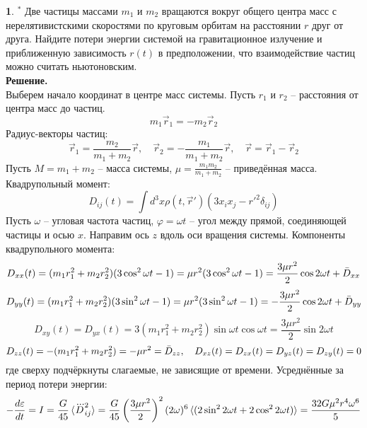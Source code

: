 \documentclass[12pt]{article}
\theoremstyle{definition}
\newtheorem{zad}{}[section]
\begin{document}
\begin{zad}
\textbf{$^*$} Две частицы массами $m_1$ и $m_2$ вращаются вокруг общего центра масс с нерелятивистскими скоростями по круговым орбитам на расстоянии $r$ друг от друга. Найдите потери энергии системой на гравитационное излучение и приближенную зависимость $r(t)$ в предположении, что взаимодействие частиц можно считать ньютоновским.\\
\textbf{Решение.}\\
Выберем начало координат в центре масс системы. Пусть $r_1$ и $r_2$ -- расстояния от центра масс до частиц.
\begin{equation}
    m_1\vec{r}_1=-m_2\vec{r}_2
\end{equation}
Радиус-векторы частиц:
\begin{equation}
    \vec{r}_1=\frac{m_2}{m_1+m_2}\vec{r},\quad \vec{r}_2=-\frac{m_1}{m_1+m_2}\vec{r},\quad \vec{r}=\vec{r}_1-\vec{r}_2
\end{equation}
Пусть $M=m_1+m_2$ -- масса системы, $\mu=\frac{m_1m_2}{m_1+m_2}$ -- приведённая масса.
Квадрупольный момент:
\begin{equation}
    D_{ij}(t)=\int d^3x\rho(t,\vec{r}')(3x_ix_j-r'^2\delta_{ij})
\end{equation}
Пусть $\omega$ -- угловая частота частиц, $\varphi=\omega t$ -- угол между прямой, соединяющей частицы и осью $x$. Направим ось $z$ вдоль оси вращения системы. Компоненты квадрупольного момента:
\begin{equation}
    D_{xx}(t)=(m_1r_1^2+m_2r_2^2)(3\cos^2\omega t-1)=\mu r^2(3\cos^2\omega t-1)=\frac{3\mu r^2}{2}\cos2\omega t+\Bar{D}_{xx}
\end{equation}
\begin{equation}
    D_{yy}(t)=(m_1r_1^2+m_2r_2^2)(3\sin^2\omega t-1)=\mu r^2(3\sin^2\omega t-1)=-\frac{3\mu r^2}{2}\cos 2\omega t+\Bar{D}_{yy}
\end{equation}
\begin{equation}
    D_{xy}(t)=D_{yx}(t)=3(m_1r_1^2+m_2r^2_2)\sin\omega t\cos\omega t=\frac{3\mu r^2}{2}\sin2\omega t
\end{equation}
\begin{equation}
    D_{zz}(t)=-(m_1r_1^2+m_2r_2^2)=-\mu r^2=\Bar{D}_{zz},\quad D_{xz}(t)=D_{zx}(t)=D_{yz}(t)=D_{zy}(t)=0
\end{equation}
где сверху подчёркнуты слагаемые, не зависящие от времени. Усреднённые за период потери энергии:
\begin{equation}
    -\frac{d\varepsilon}{dt}=I=\frac{G}{45}\braket{\dddot{D}_{ij}^2}=\frac{G}{45}\left(\frac{3\mu r^2}{2}\right)^2(2\omega)^6\braket{(2\sin^22\omega t+2\cos^22\omega t)}=\frac{32G\mu^2r^4\omega^6}{5}

\end{equation}
\end{zad}
\end{document}
